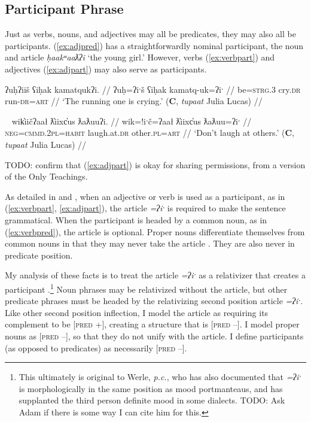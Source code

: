 \subsection{Participant Phrase} \label{sec:partp}

Just as verbs, nouns, and adjectives may all be predicates, they may also all be participants. (\ref{ex:adjpred}) has a straightforwardly nominal participant, the noun and article \textit{ḥaakʷaaƛʔi} `the young girl.' However, verbs (\ref{ex:verbpart}) and adjectives (\ref{ex:adjpart}) may also serve as participants.

\ex \label{ex:verbpart}
\begingl
\glpreamble ʔuḥʔiiš ʕiḥak kamatqukʔi. //
\gla ʔuḥ=ʔiˑš ʕiḥak kamatq-uk=ʔiˑ //
\glb be=\textsc{strg.3} cry.\textsc{dr} run-\textsc{dr}=\textsc{art} //
\glft ‘The running one is crying.’ (\textbf{C}, \textit{tupaat} Julia Lucas) //
\endgl
\xe

\ex~ \label{ex:adjpart}
\begingl
\glpreamble wik̓iičʔaał ƛ̓iixc̓us ƛaƛuuʔi. //
\gla wik=!iˑč=ʔaał ƛ̓iixc̓us ƛaƛuu=ʔiˑ //
\glb \textsc{neg}=\textsc{cmmd.2pl}=\textsc{habit} laugh.at.\textsc{dr} other.\textsc{pl}=\textsc{art} //
\glft ‘Don't laugh at others.’ (\textbf{C}, \textit{tupaat} Julia Lucas) //
\endgl
\xe

\noindent TODO: confirm that (\ref{ex:adjpart}) is okay for sharing permissions, from a version of the Only Teachings.

As detailed in \cite{jacobsen1979} and \cite{wojdak2001}, when an adjective or verb is used as a participant, as in (\ref{ex:verbpart}, \ref{ex:adjpart}), the article \textit{=ʔiˑ} is required to make the sentence grammatical. When the participant is headed by a common noun, as in (\ref{ex:verbpred}), the article is optional. Proper nouns differentiate themselves from common nouns in that they may never take the article \citep{inman2018}. They are also never in predicate position.

My analysis of these facts is to treat the article \textit{=ʔiˑ} as a relativizer that creates a participant \cite{inman2018}.\footnote{This ultimately is original to Werle, \textit{p.c.}, who has also documented that \textit{=ʔiˑ} is morphologically in the same position as mood portmanteaus, and has supplanted the third person definite mood in some dialects. TODO: Ask Adam if there is some way I can cite him for this.} Noun phrases may be relativized without the article, but other predicate phrases must be headed by the relativizing second position article \textit{=ʔiˑ}. Like other second position inflection, I model the article as requiring its complement to be [\textsc{pred} +], creating a structure that is [\textsc{pred} --]. I model proper nouns as [\textsc{pred} --], so that they do not unify with the article. I define participants (as opposed to predicates) as necessarily [\textsc{pred} --].

